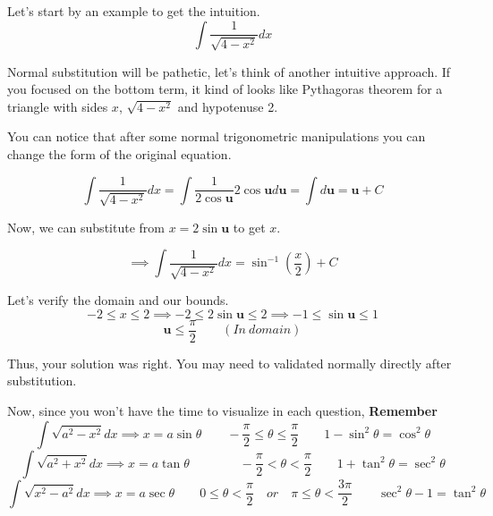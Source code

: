\documentclass{article}
\begin{document}
	Let's start by an example to get the intuition. 
	\[
		\int \frac{1}{ \sqrt{ 4-x^2 } } dx 
	\]

	Normal substitution will be pathetic, let's think of another intuitive approach. If you focused on the bottom term, it kind of looks like Pythagoras theorem for a triangle with sides $ x $, $ \sqrt{ 4-x^2 } $ and hypotenuse 2.
	\begin{center}


	\end{center}

	You can notice that after some normal trigonometric manipulations you can change the form of the original equation.

	\[
		\int \frac{1}{ \sqrt{ 4-x^2 } } dx = \int \frac{1}{2 \cos \textbf{u} }   2 \cos{ \textbf{u} } d \textbf{u} = \int	d \textbf{u} = \textbf{u} + C  
	\]

	Now, we can substitute from $ x = 2 \sin{ \textbf{u}  }  $ to get $ x $. 

	\[
		\implies 	\int \frac{1}{ \sqrt{ 4-x^2 } } dx = \sin^{-1} (\frac{x}{2}) + C
	\]

	Let's verify the domain and our bounds.
	\[
		-2 \leq x \leq 2 \implies
		-2 \leq 2 \sin{ \textbf{u}  } \leq 2 \implies
		-1 \leq \sin{ \textbf{u}  } \leq 1
	\]
	\[
		\textbf{u} \leq \frac{\pi}{2} \qquad (In\ domain)
	\]

	Thus, your solution was right. You may need to validated normally directly after substitution.

	Now, since you won't have the time to visualize in each question, \textbf{Remember }
	\[
		\int \sqrt{ a^2-x^2 } dx \implies x = a \sin{ \theta } \qquad -\frac{\pi}{2} \leq \theta \leq \frac{\pi}{2} \qquad 1 - \sin^2{ \theta }  = \cos^2{\theta} 
	\]
	\[
		\int \sqrt{ a^2+x^2 } dx \implies x = a \tan{ \theta } 
		\qquad \qquad   -\frac{\pi}{2} < \theta < \frac{\pi}{2} \qquad 1 + \tan^2{\theta} = \sec^2{\theta} 
	\]
	\[
		\int \sqrt{ x^2-a^2 } dx \implies x = a \sec{\theta}
		\qquad 0 \leq \theta < \frac{\pi}{2} \quad or \quad \pi \leq \theta < \frac{3\pi}{2} 
		\qquad \sec^2{\theta} - 1 = \tan^2{\theta}
	\]


	\newpage
\end{document}
